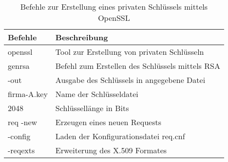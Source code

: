 \begin{table}[h]
	\centering
\begin{tabular}{|l|l|}
	\hline 
	Befehle & Beschreibung \\ 
	\hline 
	openssl & Tool zur Erstellung von privaten Schlüsseln \\ 
	\hline 
	genrsa & Befehl zum Erstellen des Schlüssels mittels RSA \\ 
	\hline 
	-out & Ausgabe des Schlüssels in angegebene Datei \\ 
	\hline 
	firma-A.key & Name der Schlüsseldatei \\ 
	\hline 
	2048 & Schlüssellänge in Bits \\ 
	\hline 
	req -new & Erzeugen eines neuen Requests \\ 
	\hline 
	-config & Laden der Konfigurationsdatei req.cnf \\ 
	\hline 
	-reqexts & Erweiterung des X.509 Formates \\ 
	\hline 
\end{tabular} 
\caption{Befehle zur Erstellung eines privaten Schlüssels mittels OpenSSL} \label{tab:openSSLOptionen}
\end{table}

